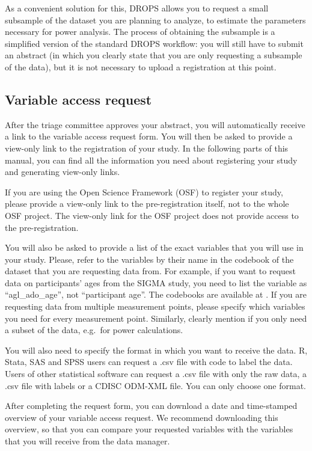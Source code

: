 \documentclass[
]{article}
\begin{document}
As a convenient solution for this, DROPS allows you to request a small
subsample of the dataset you are planning to analyze, to estimate the
parameters necessary for power analysis. The process of obtaining the
subsample is a simplified version of the standard DROPS workflow: you
will still have to submit an abstract (in which you clearly state that
you are only requesting a subsample of the data), but it is not
necessary to upload a registration at this point.

\hypertarget{variable-access-request}{%
\subsection{Variable access request}\label{variable-access-request}}

After the triage committee approves your abstract, you will
automatically receive a link to the variable access request form. You
will then be asked to provide a view-only link to the registration of
your study. In the following parts of this manual, you can find all the
information you need about registering your study and generating
view-only links.

If you are using the Open Science Framework (OSF) to register your
study, please provide a view-only link to the pre-registration itself,
not to the whole OSF project. The view-only link for the OSF project
does not provide access to the pre-registration.

You will also be asked to provide a list of the exact variables that you
will use in your study. Please, refer to the variables by their name in
the codebook of the dataset that you are requesting data from. For
example, if you want to request data on participants' ages from the
SIGMA study, you need to list the variable as ``agl\_ado\_age'', not
``participant age''. The codebooks are available at . If you are
requesting data from multiple measurement points, please specify which
variables you need for every measurement point. Similarly, clearly
mention if you only need a subset of the data, e.g.~for power
calculations.

You will also need to specify the format in which you want to receive
the data. R, Stata, SAS and SPSS users can request a .csv file with code
to label the data. Users of other statistical software can request a
.csv file with only the raw data, a .csv file with labels or a CDISC
ODM-XML file. You can only choose one format.

After completing the request form, you can download a date and
time-stamped overview of your variable access request. We recommend
downloading this overview, so that you can compare your requested
variables with the variables that you will receive from the data
manager.
\end{document}
